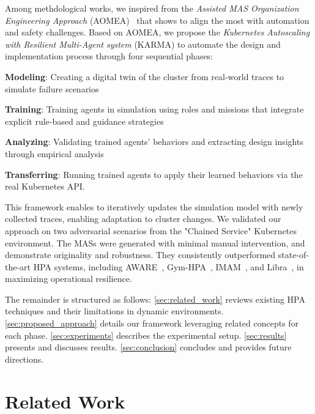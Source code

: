 \documentclass[conference]{IEEEtran}
\begin{document}
Among methdological works, we inspired from the \textit{Assisted MAS Organization Engineering Approach} (AOMEA)~\cite{soule2024aomea} that shows to align the most with automation and safety challenges. Based on AOMEA, we propose the \textit{Kubernetes Autoscaling with Resilient Multi-Agent system} (KARMA) to automate the design and implementation process through four sequential phases:
\begin{enumerate*}[label=\textbf{\arabic*)}, itemjoin={;\quad }]
    \item \textbf{Modeling}: Creating a digital twin of the cluster from real-world traces to simulate failure scenarios
    \item \textbf{Training}: Training agents in simulation using roles and missions that integrate explicit rule-based and guidance strategies
    \item \textbf{Analyzing}: Validating trained agents' behaviors and extracting design insights through empirical analysis
    \item \textbf{Transferring}: Running trained agents to apply their learned behaviors via the real Kubernetes API.
\end{enumerate*}

This framework enables to iteratively updates the simulation model with newly collected traces, enabling adaptation to cluster changes. We validated our approach on two adversarial scenarios from the "Chained Service" Kubernetes environment. The MASs were generated with minimal manual intervention, and demonstrate originality and robustness. They consistently outperformed state-of-the-art HPA systems, including AWARE~\cite{AWARE}, Gym-HPA~\cite{GymHPA}, IMAM~\cite{IMAM}, and Libra~\cite{Libra}, in maximizing operational resilience.

The remainder is structured as follows:
\autoref{sec:related_work} reviews existing HPA techniques and their limitations in dynamic environments.
\autoref{sec:proposed_approach} details our framework leveraging related concepts for each phase.
\autoref{sec:experiments} describes the experimental setup.
\autoref{sec:results} presents and discusses results.
\autoref{sec:conclusion} concludes and provides future directions.


\section{Related Work}
\label{sec:related_work}
\end{document}
